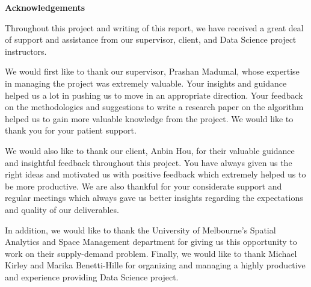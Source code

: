 \thispagestyle{empty}
\vspace*{\fill}
\begin{center}
\textbf{Acknowledgements}
\end{center}
Throughout this project and writing of this report, we have received a great deal of support and assistance from our supervisor, client, and Data Science project instructors.

We would first like to thank our supervisor, Prashan Madumal, whose expertise in managing the project was extremely valuable. Your insights and guidance helped us a lot in pushing us to move in an appropriate direction. Your feedback on the methodologies and suggestions to write a research paper on the algorithm helped us to gain more valuable knowledge from the project. We would like to thank you for your patient support.

We would also like to thank our client, Anbin Hou, for their valuable guidance and insightful feedback throughout this project. You have always given us the right ideas and motivated us with positive feedback which extremely helped us to be more productive. We are also thankful for your considerate support and regular meetings which always gave us better insights regarding the expectations and quality of our deliverables.

In addition, we would like to thank the University of Melbourne's Spatial Analytics and Space Management department for giving us this opportunity to work on their supply-demand problem. Finally, we would like to thank Michael Kirley and Marika Benetti-Hille for organizing and managing a highly productive and experience providing Data Science project.
\vspace*{\fill}
\pagebreak